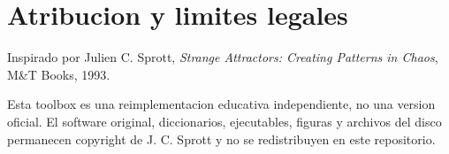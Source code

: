 \documentclass[11pt]{article}
\begin{document}
\section{Atribucion y limites legales}

Inspirado por Julien C. Sprott, \emph{Strange Attractors: Creating Patterns in Chaos},
M\&T Books, 1993.

Esta toolbox es una reimplementacion educativa independiente, no una version oficial.
El software original, diccionarios, ejecutables, figuras y archivos del disco permanecen
copyright de J. C. Sprott y no se redistribuyen en este repositorio.
\end{document}
